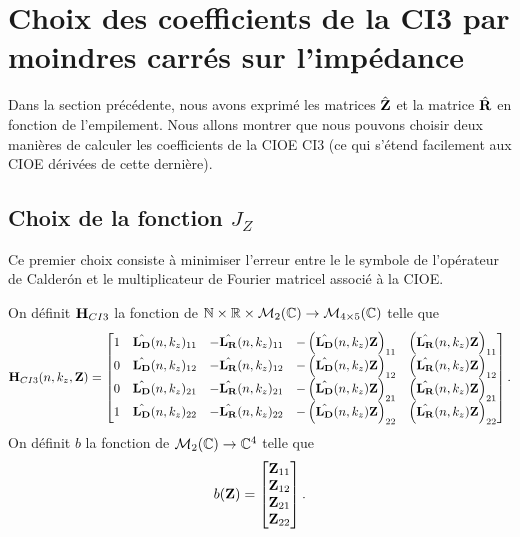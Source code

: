 \section[Choix 1 du calcul des coefficients de la CI3]{Choix des coefficients de la CI3 par moindres carrés sur l'impédance}

  Dans la section précédente, nous avons exprimé les matrices \(\hat{\mathbf{Z}}\) et la matrice \(\hat{\mathbf{R}}\) en fonction de l'empilement.
  Nous allons montrer que nous pouvons choisir deux manières de calculer les coefficients de la CIOE CI3 (ce qui s’étend facilement aux CIOE dérivées de cette dernière). 

  \subsection[Choix de la fonction Jz]{Choix de la fonction \(J_Z\)}
    Ce premier choix consiste à minimiser l'erreur entre le le symbole de l'opérateur de Calderón et le multiplicateur de Fourier matricel associé à la CIOE.
    \begin{defn}
      On définit \(\mathbf{H}_{CI3}\) la fonction de \(\mathbb N \times \mathbb R \times \mathcal{M}_2(\mathbb C) \rightarrow \mathcal{M}_{4\times5}(\mathbb C)\) telle que
      \begin{equation*}
        \mathbf{H}_{CI3}(n,k_z,\mathbf{Z}) = \begin{bmatrix}
        1 & \hat{\mathbf{L_D}}(n,k_z)_{11} & -\hat{\mathbf{L_R}}(n,k_z)_{11} & -\left(\hat{\mathbf{L_D}}(n,k_z){\mathbf{Z}}\right)_{11} & \left(\hat{\mathbf{L_R}}(n,k_z){\mathbf{Z}}\right)_{11}
        \\
        0 & \hat{\mathbf{L_D}}(n,k_z)_{12} & -\hat{\mathbf{L_R}}(n,k_z)_{12} & -\left(\hat{\mathbf{L_D}}(n,k_z){\mathbf{Z}}\right)_{12} & \left(\hat{\mathbf{L_R}}(n,k_z){\mathbf{Z}}\right)_{12}
        \\
        0 & \hat{\mathbf{L_D}}(n,k_z)_{21} & -\hat{\mathbf{L_R}}(n,k_z)_{21} & -\left(\hat{\mathbf{L_D}}(n,k_z){\mathbf{Z}}\right)_{21} & \left(\hat{\mathbf{L_R}}(n,k_z){\mathbf{Z}}\right)_{21}
        \\
        1 & \hat{\mathbf{L_D}}(n,k_z)_{22} & -\hat{\mathbf{L_R}}(n,k_z)_{22} & -\left(\hat{\mathbf{L_D}}(n,k_z){\mathbf{Z}}\right)_{22} & \left(\hat{\mathbf{L_R}}(n,k_z){\mathbf{Z}}\right)_{22}
        \end{bmatrix}.
      \end{equation*}
      On définit \(b\) la fonction de \(\mathcal{M}_2(\mathbb C) \rightarrow \mathbb C^4\) telle que
      \begin{equation*}
        b(\mathbf{Z}) = \begin{bmatrix}
        {\mathbf{Z}}_{11}
        \\
        {\mathbf{Z}}_{12}
        \\
        {\mathbf{Z}}_{21}
        \\
        {\mathbf{Z}}_{22}
        \end{bmatrix}.
      \end{equation*}
    \end{defn}

